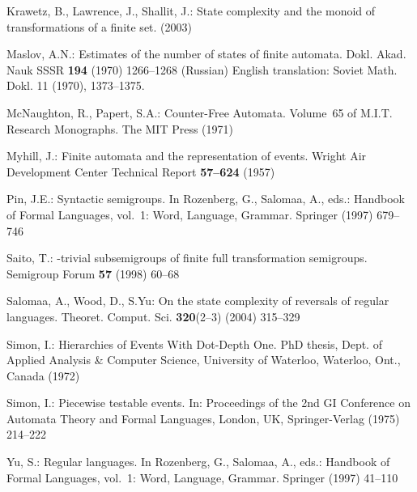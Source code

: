 \documentclass{llncs}
\begin{document}
\begin{thebibliography}{10}
Krawetz, B., Lawrence, J., Shallit, J.:
\newblock State complexity and the monoid of transformations of a finite set.
 (2003)

Maslov, A.N.:
\newblock Estimates of the number of states of finite automata.
\newblock Dokl. Akad. Nauk SSSR \textbf{194} (1970)  1266--1268 (Russian)
  {English} translation: Soviet Math. Dokl. 11 (1970), 1373--1375.

McNaughton, R., Papert, S.A.:
\newblock Counter-Free Automata. Volume~65 of M.I.T. Research Monographs.
\newblock The MIT Press (1971)

Myhill, J.:
\newblock Finite automata and the representation of events.
\newblock Wright Air Development Center Technical Report \textbf{57--624}
  (1957)

Pin, J.E.:
\newblock Syntactic semigroups.
\newblock In Rozenberg, G., Salomaa, A., eds.: Handbook of Formal Languages,
  vol.~1: Word, Language, Grammar.
\newblock Springer (1997)  679--746

Saito, T.:
\newblock {}-trivial subsemigroups of finite full
  transformation semigroups.
\newblock Semigroup Forum \textbf{57} (1998)  60--68

Salomaa, A., Wood, D., S.Yu:
\newblock On the state complexity of reversals of regular languages.
\newblock Theoret. Comput. Sci. \textbf{320}(2–3) (2004)  315--329

Simon, I.:
\newblock Hierarchies of Events With Dot-Depth One.
\newblock PhD thesis, Dept. of Applied Analysis \& Computer Science, University
  of Waterloo, Waterloo, Ont., Canada (1972)

Simon, I.:
\newblock Piecewise testable events.
\newblock In: Proceedings of the 2nd GI Conference on Automata Theory and
  Formal Languages, London, UK, Springer-Verlag (1975)  214--222

Yu, S.:
\newblock Regular languages.
\newblock In Rozenberg, G., Salomaa, A., eds.: Handbook of Formal Languages,
  vol.~1: Word, Language, Grammar.
\newblock Springer (1997)  41--110

\end{thebibliography}
\end{document}
